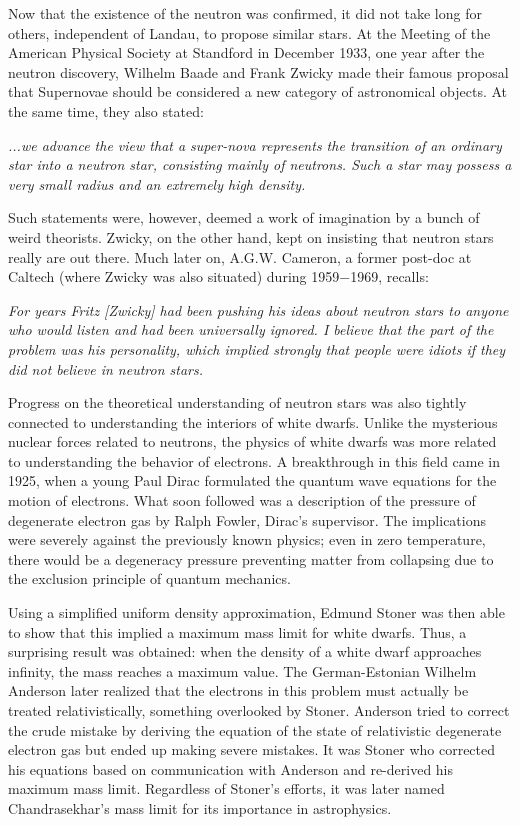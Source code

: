 Now that the existence of the neutron was confirmed, it did not take long for others, independent of Landau, to propose similar stars.
At the Meeting of the American Physical Society at Standford in December 1933, one year after the neutron discovery, Wilhelm Baade and Frank Zwicky made their famous proposal that Supernovae should be considered a new category of astronomical objects.\cite{Baade34a, Baade34aa}
At the same time, they also stated:
\begin{displayquote}
    \textit{...we advance the view that a super-nova represents the transition of an ordinary star into a neutron star, consisting mainly of neutrons. Such a star may possess a very small radius and an extremely high density.}
\end{displayquote}
Such statements were, however, deemed a work of imagination by a bunch of weird theorists.
Zwicky, on the other hand, kept on insisting that neutron stars really are out there.
Much later on, A.G.W. Cameron, a former post-doc at Caltech (where Zwicky was also situated) during 1959$-$1969, recalls:
\begin{displayquote}[A.G.W. Cameron, 1999]
    \textit{For years Fritz [Zwicky] had been pushing his ideas about neutron stars to anyone who would listen and had been universally ignored. 
    I believe that the part of the problem was his personality, which implied strongly that people were idiots if they did not believe in neutron stars.
    }
\end{displayquote}


Progress on the theoretical understanding of neutron stars was also tightly connected to understanding the interiors of white dwarfs.
Unlike the mysterious nuclear forces related to neutrons, the physics of white dwarfs was more related to understanding the behavior of electrons.
A breakthrough in this field came in 1925, when a young Paul Dirac formulated the quantum wave equations for the motion of electrons\cite{Dirac25}.
What soon followed was a description of the pressure of degenerate electron gas by Ralph Fowler, Dirac's supervisor\cite{Fowler26}.
The implications were severely against the previously known physics;
even in zero temperature, there would be a degeneracy pressure preventing matter from collapsing due to the exclusion principle of quantum mechanics.

Using a simplified uniform density approximation, Edmund Stoner was then able to show that this implied a maximum mass limit for white dwarfs.\cite{Stoner30}
Thus, a surprising result was obtained: when the density of a white dwarf approaches infinity, the mass reaches a maximum value.
The German-Estonian Wilhelm Anderson later realized that the electrons in this problem must actually be treated relativistically\cite{Anderson29}, something overlooked by Stoner.
Anderson tried to correct the crude mistake by deriving the equation of the state of relativistic degenerate electron gas but ended up making severe mistakes.
It was Stoner who corrected his equations based on communication with Anderson and re-derived his maximum mass limit.
Regardless of Stoner's efforts, it was later named Chandrasekhar's mass limit for its importance in astrophysics.

